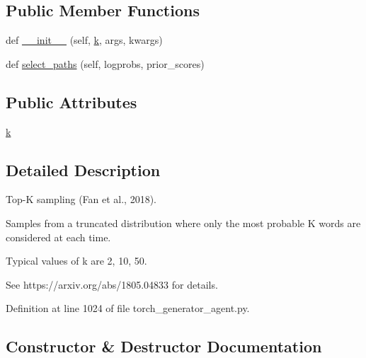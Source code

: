 \subsection*{Public Member Functions}
\begin{DoxyCompactItemize}
\item 
def \hyperlink{classparlai_1_1core_1_1torch__generator__agent_1_1TopKSampling_aa45e1c1fe90c563bf8057969417545e4}{\+\_\+\+\_\+init\+\_\+\+\_\+} (self, \hyperlink{classparlai_1_1core_1_1torch__generator__agent_1_1TopKSampling_a69d2f8e711e51151aa6649a4889e8243}{k}, args, kwargs)
\item 
def \hyperlink{classparlai_1_1core_1_1torch__generator__agent_1_1TopKSampling_a3ca83b8ee8aff13c05afbb973f948b6f}{select\+\_\+paths} (self, logprobs, prior\+\_\+scores)
\end{DoxyCompactItemize}
\subsection*{Public Attributes}
\begin{DoxyCompactItemize}
\item 
\hyperlink{classparlai_1_1core_1_1torch__generator__agent_1_1TopKSampling_a69d2f8e711e51151aa6649a4889e8243}{k}
\end{DoxyCompactItemize}


\subsection{Detailed Description}
\begin{DoxyVerb}Top-K sampling (Fan et al., 2018).

Samples from a truncated distribution where only the most probable K words
are considered at each time.

Typical values of k are 2, 10, 50.

See https://arxiv.org/abs/1805.04833 for details.
\end{DoxyVerb}
 

Definition at line 1024 of file torch\+\_\+generator\+\_\+agent.\+py.



\subsection{Constructor \& Destructor Documentation}
\mbox{\label{classparlai_1_1core_1_1torch__generator__agent_1_1TopKSampling_aa45e1c1fe90c563bf8057969417545e4}} 
